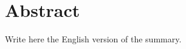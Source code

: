 \chapter*{Abstract}
\begin{otherlanguage}{english}

Write here the English version of the summary.

\mostrarPalabrasClave %

\end{otherlanguage}
